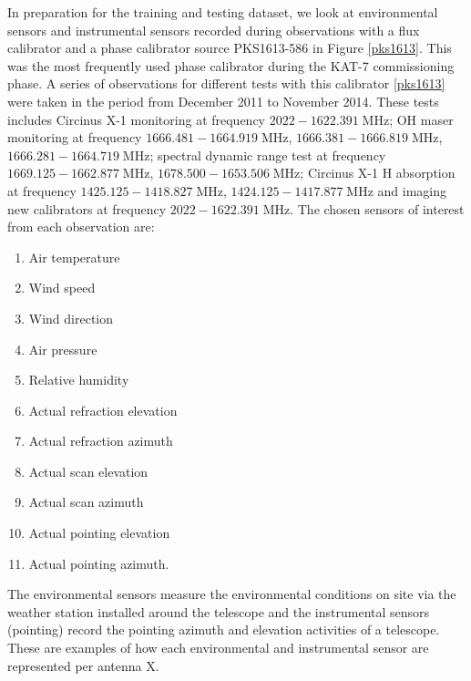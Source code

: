 In preparation for the training and testing dataset, we look at environmental sensors and instrumental sensors
recorded during observations with a flux calibrator and a phase calibrator source
PKS1613-586 in Figure \ref{pks1613}. This was the most frequently used phase calibrator during the KAT-7 commissioning phase. A series of observations for different tests with this calibrator \ref{pks1613} were taken in the period from December 2011 to November 2014. These tests includes Circinus X-1 monitoring at frequency $2022 - 1622.391 \;\text{MHz}$; OH maser monitoring at frequency $1666.481 - 1664.919 \;\text{MHz}$, $1666.381-1666.819\;\text{MHz}$,  $1666.281- 1664.719\;\text{MHz}$; spectral dynamic range test at frequency $1669.125 - 1662.877 \;\text{MHz}$, $1678.500 - 1653.506 \;\text{MHz}$; Circinus X-1 H absorption at frequency $1425.125 - 1418.827\; \text{MHz}$, $1424.125 - 1417.877 \;\text{MHz}$ and imaging new calibrators at frequency $2022 - 1622.391 \;\text{MHz}$. The chosen sensors of interest from each observation are: 
\begin{enumerate}

\item Air temperature
\item Wind speed
\item Wind direction 
\item Air pressure 
\item Relative humidity 
\item Actual refraction elevation
\item Actual refraction azimuth
\item Actual scan elevation
\item Actual scan azimuth 
\item Actual pointing elevation
\item Actual pointing azimuth. 
\end{enumerate}
The environmental sensors measure the environmental conditions on site via the weather station installed around the telescope and the instrumental sensors (pointing) record the pointing azimuth and elevation activities of a telescope. These are examples of how each environmental and instrumental sensor are represented per antenna X.

 
        
